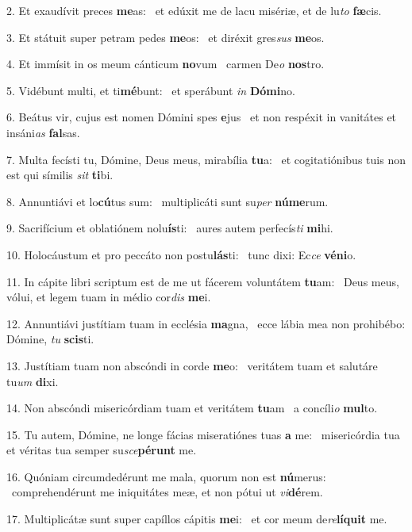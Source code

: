 2. Et exaudívit preces \textbf{me}as: \ast\  et edúxit me de lacu misériæ, et de lu\textit{to} \textbf{fæ}cis.\

3. Et státuit super petram pedes \textbf{me}os: \ast\  et diréxit gres\textit{sus} \textbf{me}os.\

4. Et immísit in os meum cánticum \textbf{no}vum \ast\  carmen De\textit{o} \textbf{nos}tro.\

5. Vidébunt multi, et ti\textbf{mé}bunt: \ast\  et sperábunt \textit{in} \textbf{Dó}\textbf{mi}no.\

6. Beátus vir, cujus est nomen Dómini spes \textbf{e}jus \ast\  et non respéxit in vanitátes et insáni\textit{as} \textbf{fal}sas.\

7. Multa fecísti tu, Dómine, Deus meus, mirabília \textbf{tu}a: \ast\  et cogitatiónibus tuis non est qui símilis \textit{sit} \textbf{ti}bi.\

8. Annuntiávi et lo\textbf{cú}tus sum: \ast\  multiplicáti sunt su\textit{per} \textbf{nú}\textbf{me}rum.\

9. Sacrifícium et oblatiónem nolu\textbf{ís}ti: \ast\  aures autem perfecís\textit{ti} \textbf{mi}hi.\

10. Holocáustum et pro peccáto non postu\textbf{lás}ti: \ast\  tunc dixi: Ec\textit{ce} \textbf{vé}\textbf{ni}o.\

11. In cápite libri scriptum est de me ut fácerem voluntátem \textbf{tu}am: \ast\  Deus meus, vólui, et legem tuam in médio cor\textit{dis} \textbf{me}i.\

12. Annuntiávi justítiam tuam in ecclésia \textbf{ma}gna, \ast\  ecce lábia mea non prohibébo: Dómine, \textit{tu} \textbf{scis}ti.\

13. Justítiam tuam non abscóndi in corde \textbf{me}o: \ast\  veritátem tuam et salutáre tu\textit{um} \textbf{di}xi.\

14. Non abscóndi misericórdiam tuam et veritátem \textbf{tu}am \ast\  a concíli\textit{o} \textbf{mul}to.\

15. Tu autem, Dómine, ne longe fácias miseratiónes tuas \textbf{a} me: \ast\  misericórdia tua et véritas tua semper su\textit{sce}\textbf{pé}\textbf{runt} me.\

16. Quóniam circumdedérunt me mala, quorum non est \textbf{nú}merus: \ast\  comprehendérunt me iniquitátes meæ, et non pótui ut \textit{vi}\textbf{dé}rem.\

17. Multiplicátæ sunt super capíllos cápitis \textbf{me}i: \ast\  et cor meum de\textit{re}\textbf{lí}\textbf{quit} me.\

